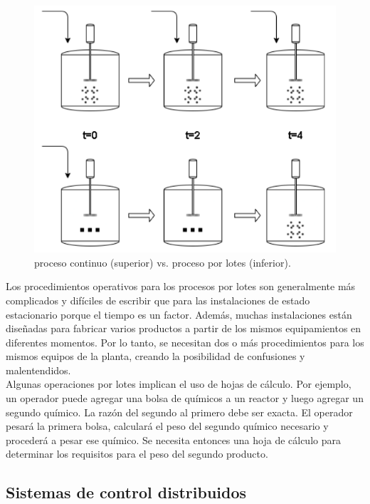 \begin{figure}[htpb]
	\centering
	\includegraphics[scale=.45]{./Figures/tanks.png}
	\caption{proceso continuo (superior) vs. proceso por lotes (inferior)\protect\footnotemark.}
	\label{fig:tanks}
\end{figure}

Los procedimientos operativos para los procesos por lotes son generalmente más complicados y difíciles de escribir que para las instalaciones de estado estacionario porque el tiempo es un factor. Además, muchas instalaciones están diseñadas para fabricar varios productos a partir de los mismos equipamientos en diferentes momentos. Por lo tanto, se necesitan dos o más procedimientos para los mismos equipos de la planta, creando la posibilidad de confusiones y malentendidos.\\

Algunas operaciones por lotes implican el uso de hojas de cálculo. Por ejemplo, un operador puede agregar una bolsa de químicos a un reactor y luego agregar un segundo químico. La razón del segundo al primero debe ser exacta. El operador pesará la primera bolsa, calculará el peso del segundo químico necesario y procederá a pesar ese químico. Se necesita entonces una hoja de cálculo para determinar los requisitos para el peso del segundo producto.

\subsection{Sistemas de control distribuidos}

